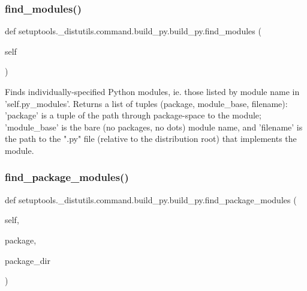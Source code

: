 \subsubsection{\texorpdfstring{find\+\_\+modules()}{find\_modules()}}
{\footnotesize\ttfamily def setuptools.\+\_\+distutils.\+command.\+build\+\_\+py.\+build\+\_\+py.\+find\+\_\+modules (\begin{DoxyParamCaption}\item[{}]{self }\end{DoxyParamCaption})}

\begin{DoxyVerb}Finds individually-specified Python modules, ie. those listed by
module name in 'self.py_modules'.  Returns a list of tuples (package,
module_base, filename): 'package' is a tuple of the path through
package-space to the module; 'module_base' is the bare (no
packages, no dots) module name, and 'filename' is the path to the
".py" file (relative to the distribution root) that implements the
module.
\end{DoxyVerb}
 \mbox{\label{classsetuptools_1_1__distutils_1_1command_1_1build__py_1_1build__py_a30053de0b378122147137c03cbd38e48}} 
\subsubsection{\texorpdfstring{find\+\_\+package\+\_\+modules()}{find\_package\_modules()}}
{\footnotesize\ttfamily def setuptools.\+\_\+distutils.\+command.\+build\+\_\+py.\+build\+\_\+py.\+find\+\_\+package\+\_\+modules (\begin{DoxyParamCaption}\item[{}]{self,  }\item[{}]{package,  }\item[{}]{package\+\_\+dir }\end{DoxyParamCaption})}

\mbox{\label{classsetuptools_1_1__distutils_1_1command_1_1build__py_1_1build__py_a61fa6da3ed68a94092877aca9696d916}} 
